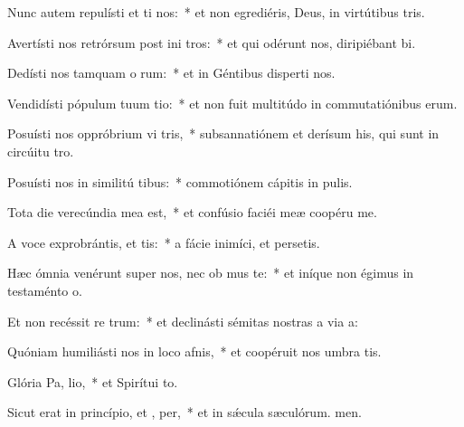 \item Nunc autem repulísti et ti nos:~* et non egrediéris, Deus, in virtútibus tris.
\item Avertísti nos retrórsum post ini tros:~* et qui odérunt nos, diripiébant bi.
\item Dedísti nos tamquam o rum:~* et in Géntibus disperti nos.
\item Vendidísti pópulum tuum  tio:~* et non fuit multitúdo in commutatiónibus erum.
\item Posuísti nos oppróbrium vi tris,~* subsannatiónem et derísum his, qui sunt in circúitu tro.
\item Posuísti nos in similitú tibus:~* commotiónem cápitis in pulis.
\item Tota die verecúndia mea   est,~* et confúsio faciéi meæ coopéru me.
\item A voce exprobrántis, et tis:~* a fácie inimíci, et persetis.
\item Hæc ómnia venérunt super nos, nec ob mus te:~* et iníque non égimus in testaménto o.
\item Et non recéssit re  trum:~* et declinásti sémitas nostras a via a:
\item Quóniam humiliásti nos in loco afnis,~* et coopéruit nos umbra tis.
\item Glória Pa,  lio,~* et Spirítui to.
\item Sicut erat in princípio, et ,  per,~* et in sǽcula sæculórum. men.
